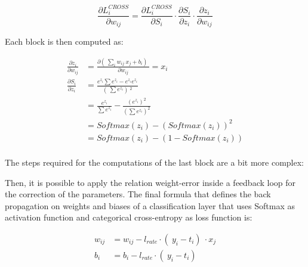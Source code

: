 \documentclass[12pt]{report}
\begin{document}
\begin{equation}
	\frac{\partial L^{CROSS}_i}{\partial w_{ij}} = \frac{\partial L^{CROSS}_i}{\partial S_i} \cdot \frac{\partial S_i}{\partial z_i} \cdot \frac{\partial z_i}{\partial w_{ij}}  
\end{equation}

Each block is then computed as:

\begin{align}
	\frac{\partial z_i}{\partial w_{ij}} &= \frac{ \partial (\ \sum_i w_{ij} \: x_j + b_i )\ }{ \partial w_{ij}} = x_i \\[10pt]
	\frac{\partial S_i}{\partial z_i} &= \frac{e^{z_i} \sum e^{z_i} - e^{z_i} e^{z_i}}{ (\ \sum e^{z_i} )\ ^2} \nonumber \\
	&= \frac{e^{z_i}}{\sum e^{z_i}}- \frac{(e^{z_i})^2}{(\sum e^{z_i})^2} \nonumber \\
	&= Softmax(z_i) - (Softmax(z_i))^2 \nonumber \\
	&= Softmax(z_i) - (1-Softmax(z_i)) \\[10pt]
\end{align}

The steps required for the computations of the last block are a bit more complex:

	

Then, it is possible to apply the relation weight-error inside a feedback loop for the correction of the parameters. The final formula that defines the back propagation on weights and biases of a classification layer that uses Softmax as activation function and categorical cross-entropy as loss function is:

\begin{align}
	w_{ij} &= w_{ij} - l_{rate} \cdot (\ y_i-t_i )\ \cdot x_j \label{w_update} \\
	b_i    &= b_i    - l_{rate} \cdot (\ y_i-t_i )\ \label{b_update} 
\end{align}
\end{document}
